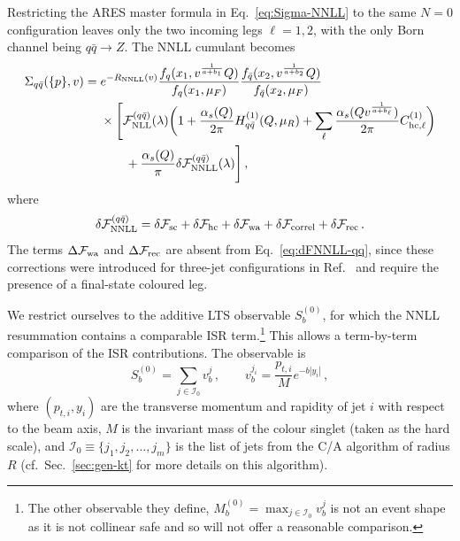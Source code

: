 Restricting the \textsc{ARES} master formula in Eq.~\eqref{eq:Sigma-NNLL}
 to the same $N=0$ configuration leaves only the two incoming legs 
 $\ell=1,2$, with the only Born channel being $q\bar q\to Z$. The NNLL
cumulant becomes
\begin{equation}
  \label{eq:Sigma-qqbar}
  \begin{split}
  \Sigma_{q\bar q}(\{p\},v)= {}& e^{-R_{\rm NNLL}(v)} \frac{f_{q}(x_1,v^{\frac{1}{a+b_1}}Q)}{f_{q}(x_1,\mu_F)} \frac{f_{\bar q}(x_2,v^{\frac{1}{a+b_2}}Q)}{f_{\bar q}(x_2,\mu_F)}\\
  &\times\Bigg[\mathcal{F}^{(q\bar q)}_{\rm NLL}(\lambda)\bigg(1+\frac{\alpha_s(Q)}{2\pi}H_{q\bar q}^{(1)}(Q,\mu_R)+\sum_{\ell}\frac{\alpha_s(Q v^{\frac{1}{a+b_\ell}})}{2\pi}C_{\mathrm{hc},\ell}^{(1)}\bigg)\\
  &\qquad+\frac{\alpha_s(Q)}{\pi} \delta\mathcal{F}^{(q\bar q)}_{\rm NNLL}(\lambda)\Bigg]\,,
  \end{split}
\end{equation}
where 
\begin{equation}
\label{eq:dFNNLL-qq}
	 \delta\mathcal{F}^{(q\bar q)}_{\rm NNLL} = \delta\mathcal{F}_{\rm sc}+\delta\mathcal{F}_{\rm hc}+\delta\mathcal{F}_{\rm wa}+\delta\mathcal{F}_{\rm correl}+\delta \mathcal{F}_{\mathrm{rec}}\,.
\end{equation}
The terms $\Delta\mathcal{F}_{\rm wa}$ and $\Delta\mathcal{F}_{\rm rec}$
are absent from Eq.~\eqref{eq:dFNNLL-qq}, since these corrections were introduced
for three-jet configurations in Ref.~\cite{Arpino:2019ozn} and require the
presence of a final-state coloured leg. 

We restrict ourselves to the additive LTS observable $S_b^{(0)}$,
for which the NNLL resummation contains a comparable ISR
term.\footnote{The other observable they define, $M_b^{(0)}=\max_{j\in\mathcal{I}_0}v_b^j$
is not an event shape as it is not collinear safe and so will not offer a reasonable comparison.}
This allows a term-by-term
comparison of the ISR contributions. The observable is
\begin{equation} 
\label{eq:Sb0-def} 
S_b^{(0)} = \sum_{j\in\mathcal{I}_0}v_b^j \,, \qquad v_b^{j_i} = \frac{p_{t,i}}{M}e^{-b|y_i|}\,,
\end{equation} 
where $(p_{t,i},y_i)$ are the transverse momentum and rapidity of
jet $i$ with respect to the beam axis, $M$ is the invariant mass of
the colour singlet (taken as the hard scale), and
$\mathcal{I}_0\equiv\{j_1,j_2,\dots,j_m\}$ is the list of jets from
the C/A algorithm of radius $R$ (cf.\ Sec.~\ref{sec:gen-kt} for more details on
this algorithm). 

